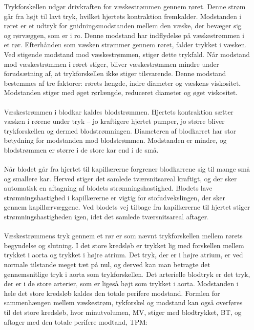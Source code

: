 Trykforskellen udgør drivkraften for væskestrømmen gennem røret. Denne strøm går fra højt til lavt tryk, hvilket hjertets kontraktion fremkalder. Modstanden i røret er et udtryk for gnidningsmodstanden mellem den væske, der bevæger sig og rørvæggen, som er i ro. Denne modstand har indflydelse på væskestrømmen i et rør. Efterhånden som væsken strømmer gennem røret, falder trykket i væsken. Ved stigende modstand mod væskestrømmen, stiger dette trykfald. Når modstand mod væskestrømmen i røret stiger, bliver væskestrømmen mindre under forudsætning af, at trykforskellen ikke stiger tilsvarende. Denne modstand bestemmes af tre faktorer: rørets længde, indre diameter og væskens viskositet. 
Modstanden stiger med øget rørlængde, reduceret diameter og øget viskositet. 
\\ \\
Væskestrømmen i blodkar kaldes blodstrømmen. Hjertets kontraktion sætter væsken i rørene under tryk – jo kraftigere hjertet pumper, jo større bliver trykforskellen og dermed blodstrømningen. Diameteren af blodkarret har stor betydning for modstanden mod blodstrømmen. Modstanden er mindre, og blodstrømmen er større i de store kar end i de små.
\\\\
Når blodet går fra hjertet til kapillærerne forgrener blodkarrene sig til mange små og smallere kar. Herved stiger det samlede tværsnitsareal kraftigt, og der sker automatisk en aftagning af blodets strømningshastighed. Blodets lave strømningshastighed i kapillærerne er vigtig for stofudvekslingen, der sker gennem kapillærvæggene. Ved blodets vej tilbage fra kapillærerne til hjertet stiger strømningshastigheden igen, idet det samlede tværsnitsareal aftager.
\\\\
Væskestrømmens tryk gennem et rør er som nævnt trykforskellen mellem rørets begyndelse og slutning. I det store kredsløb er trykket lig med forskellen mellem trykket i aorta og trykket i højre atrium. Det tryk, der er i højre atrium, er ved normale tilstande meget tæt på nul, og derved kan man betragte det gennemsnitlige tryk i aorta som trykforskellen. Det arterielle blodtryk er det tryk, der er i de store arterier, som er ligeså højt som trykket i aorta. Modstanden i hele det store kredsløb kaldes den totale perifere modstand. Formlen for sammenhængen mellem væskestrøm, tykforskel og modstand kan også overføres til det store kredsløb, hvor minutvolumen, MV, stiger med blodtrykket, BT, og aftager med den totale perifere modtand, TPM:

